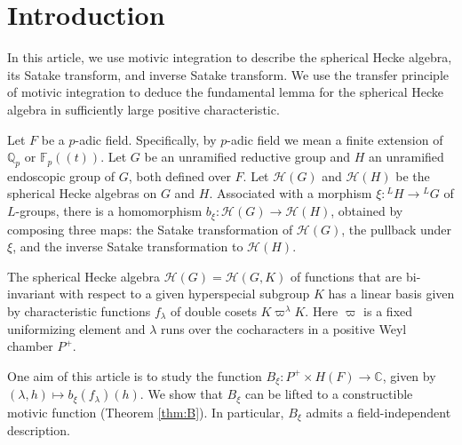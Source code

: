
% 
% 


\newcommand{\XX}[1]{{\it  [To do: #1]}}
\newcommand{\ring}[1]{\mathbb{#1}}
\newcommand{\g}[1]{\langle{#1}\rangle}
\def\op#1{{\operatorname{#1}}}
\def\inv{\op{inv}}
\def\dom{P^+}
\def\Q{{\ring{Q}}}
\def\card{\op{card}}

\def\C{\mathcal C}
\def\N{\mathcal N}
\def\H{\mathcal H}
\def\M{\mathcal M}
\def\T{\mathcal T}

\def\n{{\mathfrak n}}


\def\libel#1{{\text{\sc [#1]~}}\label{#1}}
\def\rif#1{(\ref{#1}-{\text{\sc #1})}}



\section{Introduction}\libel{XX} %

In this article, we use motivic integration to describe the spherical
Hecke algebra, its Satake transform, and inverse Satake transform.
We use the transfer principle of motivic integration to deduce the fundamental
lemma for the spherical Hecke algebra in sufficiently large positive characteristic.

Let $F$ be a $p$-adic field.  Specifically, 
by $p$-adic field we mean a finite extension of $\ring{Q}_p$ or $\ring{F}_p((t))$.
Let $G$ be an unramified reductive group and $H$ an unramified endoscopic group of $G$, both defined over $F$.
Let $\H(G)$ and $\H(H)$ be the spherical Hecke algebras on $G$ and $H$.
Associated with  a morphism $\xi:{}^LH\to {}^LG$ of $L$-groups, there is a homomorphism
$b_\xi:\H(G)\to \H(H)$, obtained by composing three maps: the Satake transformation of $\H(G)$,
the pullback under $\xi$, and the inverse Satake transformation to $\H(H)$.

The spherical Hecke algebra $\H(G)=\H(G,K)$ of functions that are bi-invariant with respect
to a given hyperspecial subgroup $K$ has a linear basis given by characteristic functions $f_\lambda$
of double cosets $K\varpi^\lambda K$.  Here $\varpi$ is a fixed uniformizing element and $\lambda$
runs over the cocharacters in a positive Weyl chamber $P^+$.

One aim of this article is to study the function $B_\xi:P^+\times H(F)\to \ring{C}$, given by
$(\lambda,h)\mapsto b_\xi(f_\lambda)(h)$.   We show that $B_\xi$ can be lifted to a constructible motivic
function (Theorem \ref{thm:B}).   In particular, $B_\xi$ admits a field-independent description.  

